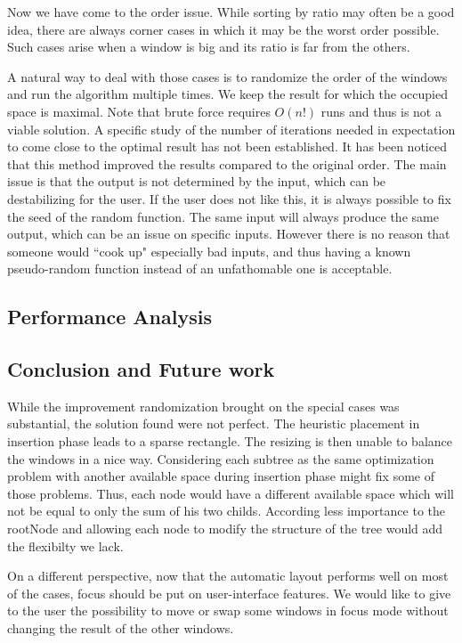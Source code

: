 \documentclass{acmtog}
\begin{document}
Now we have come to the order issue. While sorting by ratio may often be a good idea, there are always corner cases in which it may be the worst order possible. Such cases arise when a window is big and its ratio is far from the others.

A natural way to deal with those cases is to randomize the order of the windows and run the algorithm multiple times. We keep the result for which the occupied space is maximal. Note that brute force requires $O(n!)$ runs and thus is not a viable solution. A specific study of the number of iterations needed in expectation to come close to the optimal result has not been established. It has been noticed that this method improved the results compared to the original order. The main issue is that the output is not determined by the input, which can be destabilizing for the user. If the user does not like this, it is always possible to fix the seed of the random function. The same input will always produce the same output, which can be an issue on specific inputs. However there is no reason that someone would ``cook up" especially bad inputs, and thus having a known pseudo-random function instead of an unfathomable one is acceptable.  

\subsection{Performance Analysis}


\subsection{Conclusion and Future work}

While the improvement randomization brought on the special cases was substantial, the solution found were not perfect. The heuristic placement in insertion phase leads to a sparse rectangle. The resizing is then unable to balance the windows in a nice way. Considering each subtree as the same optimization problem with another available space during insertion phase might fix some of those problems. Thus, each node would have a different available space which will not be equal to only the sum of his two childs. According less importance to the rootNode and allowing each node to modify the structure of the tree would add the flexibilty we lack.

On a different perspective, now that the automatic layout performs well on most of the cases, focus should be put on user-interface features. We would like to give to the user the possibility to move or swap some windows in focus mode without changing the result of the other windows. 
\begin{acks}
 
\end{acks}




 
\end{document}
